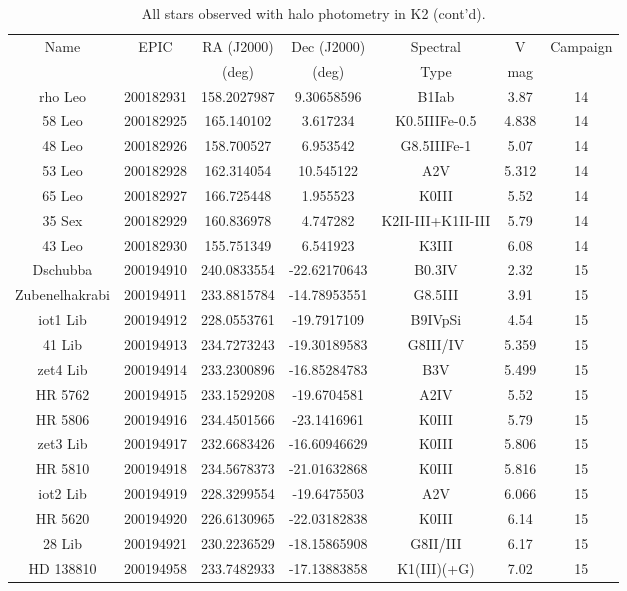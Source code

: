 \begin{table*}
\caption{All stars observed with halo photometry in K2 (cont'd).}
\begin{tabular}{ccccccc}
\hline \hline
Name & EPIC & RA (J2000) & Dec (J2000) & Spectral & V & Campaign \\
 &  & (deg) & (deg) & Type & mag &  \\
\hline
rho Leo & 200182931 & 158.2027987 & 9.30658596 & B1Iab & 3.87 & 14 \\
58 Leo & 200182925 & 165.140102 & 3.617234 & K0.5IIIFe-0.5 & 4.838 & 14 \\
48 Leo & 200182926 & 158.700527 & 6.953542 & G8.5IIIFe-1 & 5.07 & 14 \\
53 Leo & 200182928 & 162.314054 & 10.545122 & A2V & 5.312 & 14 \\
65 Leo & 200182927 & 166.725448 & 1.955523 & K0III & 5.52 & 14 \\
35 Sex & 200182929 & 160.836978 & 4.747282 & K2II-III+K1II-III & 5.79 & 14 \\
43 Leo & 200182930 & 155.751349 & 6.541923 & K3III & 6.08 & 14 \\
Dschubba & 200194910 & 240.0833554 & -22.62170643 & B0.3IV & 2.32 & 15 \\
Zubenelhakrabi & 200194911 & 233.8815784 & -14.78953551 & G8.5III & 3.91 & 15 \\
iot1 Lib & 200194912 & 228.0553761 & -19.7917109 & B9IVpSi & 4.54 & 15 \\
41 Lib & 200194913 & 234.7273243 & -19.30189583 & G8III/IV & 5.359 & 15 \\
zet4 Lib & 200194914 & 233.2300896 & -16.85284783 & B3V & 5.499 & 15 \\
HR 5762 & 200194915 & 233.1529208 & -19.6704581 & A2IV & 5.52 & 15 \\
HR 5806 & 200194916 & 234.4501566 & -23.1416961 & K0III & 5.79 & 15 \\
zet3 Lib & 200194917 & 232.6683426 & -16.60946629 & K0III & 5.806 & 15 \\
HR 5810 & 200194918 & 234.5678373 & -21.01632868 & K0III & 5.816 & 15 \\
iot2 Lib & 200194919 & 228.3299554 & -19.6475503 & A2V & 6.066 & 15 \\
HR 5620 & 200194920 & 226.6130965 & -22.03182838 & K0III & 6.14 & 15 \\
28 Lib & 200194921 & 230.2236529 & -18.15865908 & G8II/III & 6.17 & 15 \\
HD 138810 & 200194958 & 233.7482933 & -17.13883858 & K1(III)(+G) & 7.02 & 15 \\

\end{tabular}
\end{table*}
